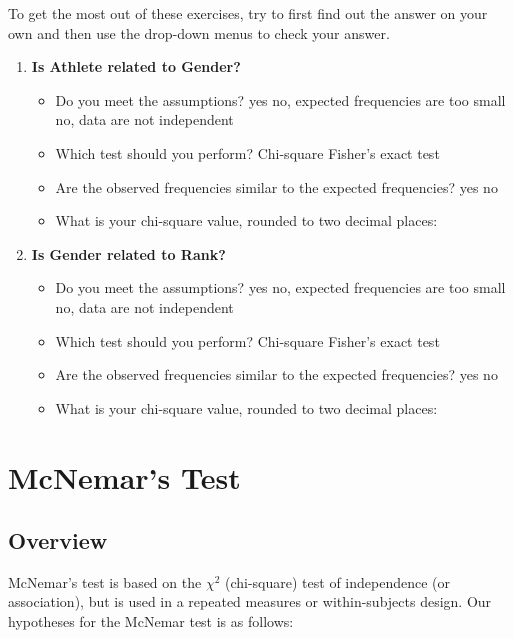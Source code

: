 \documentclass[
]{book}
\begin{document}
To get the most out of these exercises, try to first find out the answer on your own and then use the drop-down menus to check your answer.

\begin{enumerate}
\def\labelenumi{\arabic{enumi}.}
\item
  \textbf{Is Athlete related to Gender?}

  \begin{itemize}
  \item
    Do you meet the assumptions? yes no, expected frequencies are too small no, data are not independent
  \item
    Which test should you perform? Chi-square Fisher's exact test
  \item
    Are the observed frequencies similar to the expected frequencies? yes no
  \item
    What is your chi-square value, rounded to two decimal places:
  \end{itemize}
\item
  \textbf{Is Gender related to Rank?}

  \begin{itemize}
  \item
    Do you meet the assumptions? yes no, expected frequencies are too small no, data are not independent
  \item
    Which test should you perform? Chi-square Fisher's exact test
  \item
    Are the observed frequencies similar to the expected frequencies? yes no
  \item
    What is your chi-square value, rounded to two decimal places:
  \end{itemize}
\end{enumerate}

\hypertarget{mcnemars-test}{%
\section{McNemar's Test}\label{mcnemars-test}}

\hypertarget{overview-5}{%
\subsection{Overview}\label{overview-5}}

McNemar's test is based on the \(\chi^2\) (chi-square) test of independence (or association), but is used in a repeated measures or within-subjects design. Our hypotheses for the McNemar test is as follows:
\end{document}
